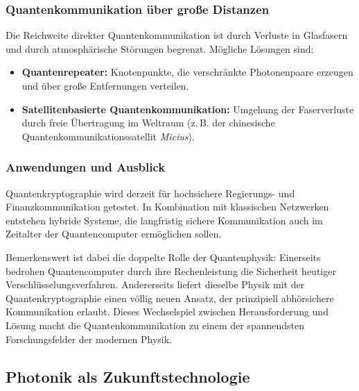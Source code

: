 \subsubsection{Quantenkommunikation über große Distanzen}

Die Reichweite direkter Quantenkommunikation ist durch Verluste in Glasfasern und durch atmosphärische Störungen begrenzt. Mögliche Lösungen sind:
\begin{itemize}
	\item \textbf{Quantenrepeater:} Knotenpunkte, die verschränkte Photonenpaare erzeugen und über große Entfernungen verteilen.
	\item \textbf{Satellitenbasierte Quantenkommunikation:} Umgehung der Faserverluste durch freie Übertragung im Weltraum (z.\,B. der chinesische Quantenkommunikationssatellit \emph{Micius}).
\end{itemize}

\subsubsection{Anwendungen und Ausblick}

Quantenkryptographie wird derzeit für hochsichere Regierungs- und Finanzkommunikation getestet. In Kombination mit klassischen Netzwerken entstehen hybride Systeme, die langfristig sichere Kommunikation auch im Zeitalter der Quantencomputer ermöglichen sollen.

Bemerkenswert ist dabei die doppelte Rolle der Quantenphysik:  
Einerseits bedrohen Quantencomputer durch ihre Rechenleistung die Sicherheit heutiger Verschlüsselungsverfahren.  
Andererseits liefert dieselbe Physik mit der Quantenkryptographie einen völlig neuen Ansatz, der prinzipiell abhörsichere Kommunikation erlaubt.  
Dieses Wechselspiel zwischen Herausforderung und Lösung macht die Quantenkommunikation zu einem der spannendsten Forschungsfelder der modernen Physik.

\subsection{Photonik als Zukunftstechnologie}


